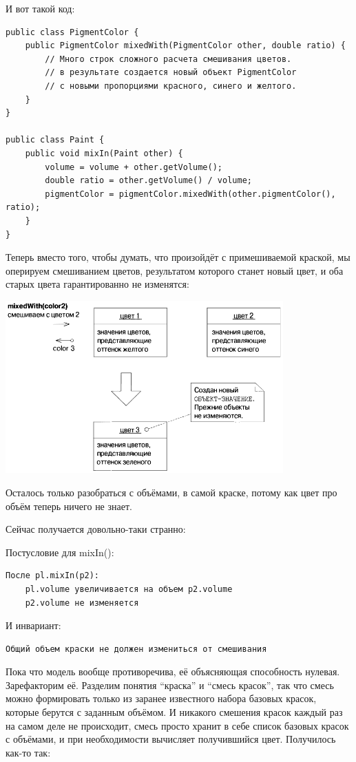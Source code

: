 \documentclass[a5paper]{article}
\begin{document}
И вот такой код:

\begin{verbatim}
public class PigmentColor {
    public PigmentColor mixedWith(PigmentColor other, double ratio) {
        // Много строк сложного расчета смешивания цветов.
        // в результате создается новый объект PigmentColor
        // с новыми пропорциями красного, синего и желтого.
    }
}

public class Paint {
    public void mixIn(Paint other) {
        volume = volume + other.getVolume();
        double ratio = other.getVolume() / volume;
        pigmentColor = pigmentColor.mixedWith(other.pigmentColor(), ratio);
    }
}
\end{verbatim}

Теперь вместо того, чтобы думать, что произойдёт с примешиваемой краской, мы оперируем смешиванием цветов, результатом которого станет новый цвет, и оба старых цвета гарантированно не изменятся:

\begin{center}
    \includegraphics[width=0.8\textwidth]{pigmentColorValueObject.png}
\end{center}

Осталось только разобраться с объёмами, в самой краске, потому как цвет про объём теперь ничего не знает.

Сейчас получается довольно-таки странно:

Постусловие для mixIn():
{\color{blue}
\begin{verbatim}
После pl.mixIn(p2):
    pl.volume увеличивается на объем p2.volume
    p2.volume не изменяется
\end{verbatim} }
И инвариант:
{\color{blue}
\begin{verbatim}
Общий объем краски не должен измениться от смешивания
\end{verbatim} }

Пока что модель вообще противоречива, её объясняющая способность нулевая. Зарефакторим её. Разделим понятия ``краска'' и ``смесь красок'', так что смесь можно формировать только из заранее известного набора базовых красок, которые берутся с заданным объёмом. И никакого смешения красок каждый раз на самом деле не происходит, смесь просто хранит в себе список базовых красок с объёмами, и при необходимости вычисляет получившийся цвет. Получилось как-то так:
\end{document}
